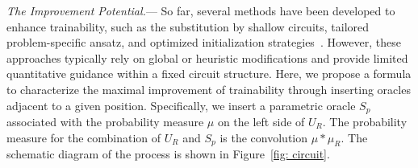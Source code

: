 \documentclass[%
 reprint,
 superscriptaddress,
 amsmath,amssymb,
 aps, prl, twocolumn, showpacs,
]{revtex4-2}
\begin{document}
\emph{The Improvement Potential.}--- So far, several methods have been developed to enhance trainability, such as the substitution by shallow circuits, tailored problem-specific ansatz, and optimized initialization strategies~\cite{zhang2024absence,cerezo2021cost, liu2024mitigating, grant2019initialization}. However, these approaches typically rely on global or heuristic modifications and provide limited quantitative guidance within a fixed circuit structure. Here, we propose a formula to characterize the maximal improvement of trainability through inserting oracles adjacent to a given position. Specifically, we insert a parametric oracle $S_p$ associated with the probability measure $\mu$ on the left side of $U_R$. The probability measure for the combination of $U_R$ and $S_p$ is the convolution $\mu * \mu_R$. The schematic diagram of the process is shown in Figure~\ref{fig: circuit}.
\end{document}
